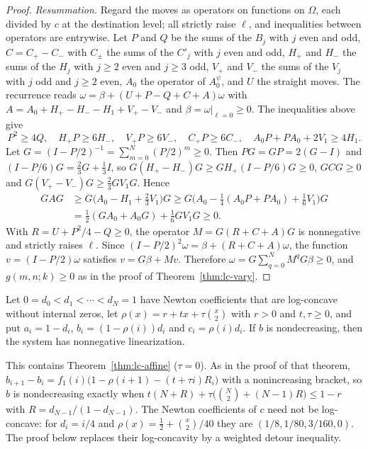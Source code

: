 \begin{proof}
\emph{Resummation.} Regard the moves as operators on functions on $\Omega$, each divided by $c$ at the destination level; all strictly raise $\ell$, and inequalities between operators are entrywise. Let $P$ and $Q$ be the sums of the $B_j$ with $j$ even and odd, $C=C_+-C_-$ with $C_\pm$ the sums of the $C'_j$ with $j$ even and odd, $H_+$ and $H_-$ the sums of the $H_j$ with $j\geq2$ even and $j\geq3$ odd, $V_+$ and $V_-$ the sums of the $V_j$ with $j$ odd and $j\geq2$ even, $A_0$ the operator of $A^\psi_0$, and $U$ the straight moves. The recurrence reads $\omega=\beta+(U+P-Q+C+A)\omega$ with $A=A_0+H_+-H_--H_1+V_+-V_-$ and $\beta=\omega|_{\ell=0}\geq0$. The inequalities above give
\[
P^2\geq4Q,\quad H_+P\geq6H_-,\quad V_+P\geq6V_-,\quad C_+P\geq6C_-,\quad A_0P+PA_0+2V_1\geq4H_1.
\]
Let $G=(I-P/2)^{-1}=\sum_{m=0}^N(P/2)^m\geq0$. Then $PG=GP=2(G-I)$ and $(I-P/6)G=\frac23G+\frac13I$, so $G(H_+-H_-)G\geq GH_+(I-P/6)G\geq0$, $GCG\geq0$ and $G(V_+-V_-)G\geq\frac23GV_1G$. Hence
\[
\begin{aligned}
GAG&\geq G\bigl(A_0-H_1+\tfrac23V_1\bigr)G\geq G\bigl(A_0-\tfrac14(A_0P+PA_0)+\tfrac16V_1\bigr)G\\
&=\tfrac12(GA_0+A_0G)+\tfrac16GV_1G\geq0.
\end{aligned}
\]
With $R=U+P^2/4-Q\geq0$, the operator $M=G(R+C+A)G$ is nonnegative and strictly raises $\ell$. Since $(I-P/2)^2\omega=\beta+(R+C+A)\omega$, the function $v=(I-P/2)\omega$ satisfies $v=G\beta+Mv$. Therefore $\omega=G\sum_{q=0}^NM^qG\beta\geq0$, and $g(m,n;k)\geq0$ as in the proof of Theorem~\ref{thm:lc-vary}.
\end{proof}

\begin{theorem}\label{thm:lc-quadratic}
Let $0=d_0<d_1<\cdots<d_N=1$ have Newton coefficients that are log-concave without internal zeros, let $\rho(x)=r+tx+\tau\binom x2$ with $r>0$ and $t,\tau\geq0$, and put $a_i=1-d_i$, $b_i=(1-\rho(i))d_i$ and $c_i=\rho(i)d_i$. If $b$ is nondecreasing, then the system has nonnegative linearization.
\end{theorem}

This contains Theorem~\ref{thm:lc-affine} ($\tau=0$). As in the proof of that theorem, $b_{i+1}-b_i=f_1(i)\bigl(1-\rho(i+1)-(t+\tau i)R_i\bigr)$ with a nonincreasing bracket, so $b$ is nondecreasing exactly when $t(N+R)+\tau\bigl(\binom N2+(N-1)R\bigr)\leq1-r$ with $R=d_{N-1}/(1-d_{N-1})$. The Newton coefficients of $c$ need not be log-concave: for $d_i=i/4$ and $\rho(x)=\frac12+\binom x2/40$ they are $(1/8,1/80,3/160,0)$. The proof below replaces their log-concavity by a weighted detour inequality.

